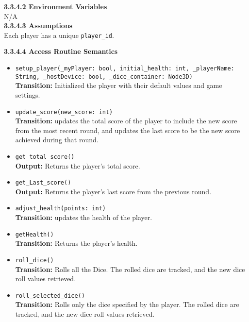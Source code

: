 \documentclass[12pt, titlepage]{article}
\begin{document}
\textbf{3.3.4.2 Environment Variables}\\
N/A\\

\textbf{3.3.4.3 Assumptions}\\
Each player has a unique \texttt{player\_id}.

\textbf{3.3.4.4 Access Routine Semantics}
\begin{itemize}

	\item \texttt{setup\_player(\_myPlayer: bool, initial\_health: int, \_playerName: String, \_hostDevice: bool, \_dice\_container: Node3D)}\\
	 \textbf{Transition:} Initialized the player with their default values and game settings.
	
    \item \texttt{update\_score(new\_score: int)}\\
    	\textbf{Transition:} updates the total score of the player to include the new score from the most recent round, and updates the last score to be the new score achieved during that round.
    
    \item \texttt{get\_total\_score()}\\
    \textbf{Output:} Returns the player's total score.
        	
    \item \texttt{get\_Last\_score()}\\
    \textbf{Output:} Returns the player's last score from the previous round.
    
    \item \texttt{adjust\_health(points: int)}\\
    \textbf{Transition:} updates the health of the player.
    
    \item \texttt{getHealth()}\\
    \textbf{Transition:} Returns the player's health.
    
    \item \texttt{roll\_dice()}\\
    \textbf{Transition:} Rolls all the Dice. The rolled dice are tracked, and the new dice roll values retrieved.
    
    \item \texttt{roll\_selected\_dice()}\\
    \textbf{Transition:} Rolls only the dice specified by the player. The rolled dice are tracked, and the new dice roll values retrieved.
    

\end{itemize}
\end{document}
